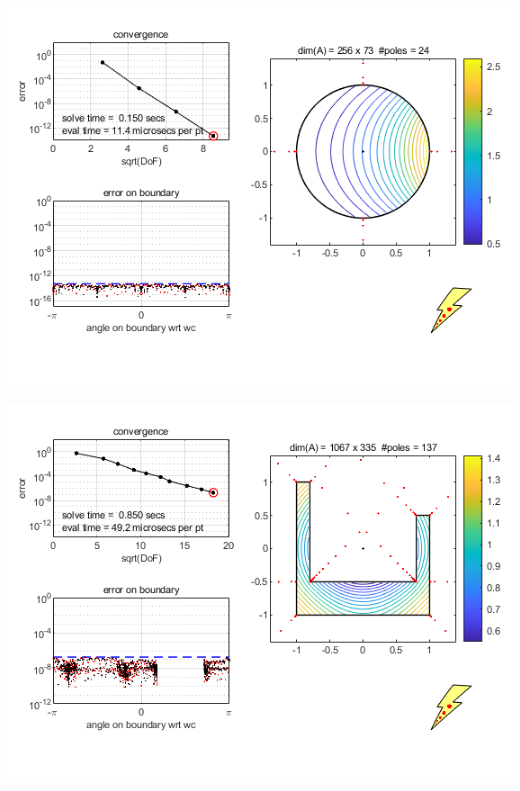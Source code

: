 \documentclass{seminar}
\begin{document}
\begin{slide} %
\begin{center}
\includegraphics[scale=0.7]{./PNG/circ_example}
\end{center}
\end{slide}
\begin{slide}
\begin{center}
\includegraphics[scale=0.7]{./PNG/ushape_example}
\end{center}
\end{slide}
\end{document}
